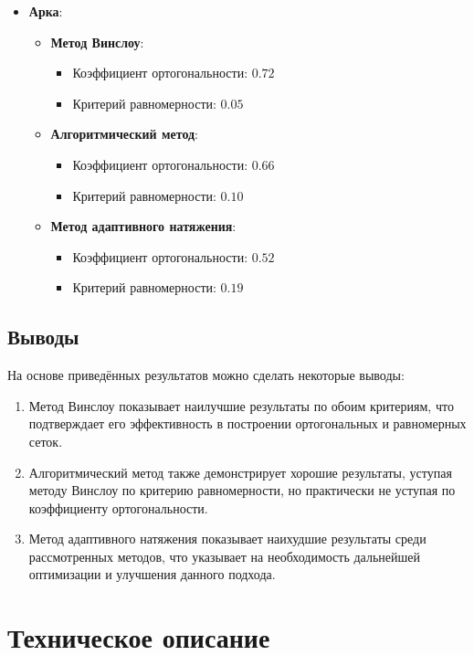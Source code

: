 \documentclass[a4paper,14pt,russian]{extreport}
\renewcommand{\_}{\kern-1.5pt\textunderscore\kern-1.5pt}
\begin{document}
\begin{itemize}
    \item \textbf{Арка}:
    \begin{itemize}
        \item \textbf{Метод Винслоу}:
        \begin{itemize}
            \item Коэффициент ортогональности: \(0.72\)
            \item Критерий равномерности: \(0.05\)
        \end{itemize}
        \item \textbf{Алгоритмический метод}:
        \begin{itemize}
            \item Коэффициент ортогональности: \(0.66\)
            \item Критерий равномерности: \(0.10\)
        \end{itemize}
        \item \textbf{Метод адаптивного натяжения}:
        \begin{itemize}
            \item Коэффициент ортогональности: \(0.52\)
            \item Критерий равномерности: \(0.19\)
        \end{itemize}
    \end{itemize}
\end{itemize}

\section{Выводы}

На основе приведённых результатов можно сделать некоторые выводы:
\begin{enumerate}
    \item Метод Винслоу показывает наилучшие результаты по обоим критериям, что подтверждает его эффективность в построении ортогональных и равномерных сеток.
    \item Алгоритмический метод также демонстрирует хорошие результаты, уступая методу Винслоу по критерию равномерности, но практически не уступая по коэффициенту ортогональности.
    \item Метод адаптивного натяжения показывает наихудшие результаты среди рассмотренных методов, что указывает на необходимость дальнейшей оптимизации и улучшения данного подхода.
\end{enumerate}


\chapter{Техническое описание}
\end{document}
